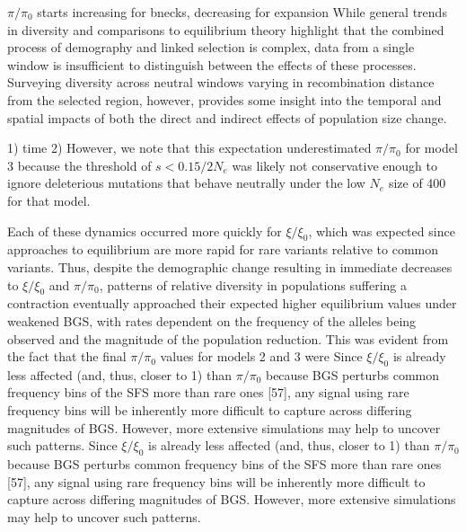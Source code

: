 \documentclass[9pt,twocolumn,twoside]{rilabRxiv}
\begin{document}
$\pi/\pi_0$ starts increasing for bnecks, decreasing for expansion
While general trends in diversity and comparisons to equilibrium theory highlight that the combined process of demography and linked selection is complex, data from a single window is insufficient to distinguish between the effects of these processes.
Surveying diversity across neutral windows varying in recombination distance from the selected region, however, provides some insight into the temporal and spatial impacts of both the direct and indirect effects of population size change. 


1) time 2) However, we note that this expectation underestimated $\pi/\pi_0$ for model 3 because the threshold of $s < 0.15/2N_e$ was likely not conservative enough to ignore deleterious mutations that behave neutrally under the low $N_e$ size of 400 for that model.

Each of these dynamics occurred more quickly for $\xi/\xi_0$, which was expected since approaches to equilibrium are more rapid for rare variants relative to common variants.
Thus, despite the demographic change resulting in immediate decreases to $\xi/\xi_0$ and $\pi/\pi_0$, patterns of relative diversity in populations suffering a contraction eventually approached their expected higher equilibrium values under weakened BGS, with rates dependent on the frequency of the alleles being observed and the  magnitude of the population reduction. 
This was evident from the fact that the final $\pi/\pi_0$ values for models 2 and 3 were
Since $\xi/\xi_0$ is already less affected (and, thus, closer to 1) than $\pi/\pi_0$ because BGS perturbs common frequency bins of the SFS more than rare ones [57], any signal using rare frequency bins will be inherently more difficult to capture across differing magnitudes of BGS. However, more extensive simulations may help to uncover such patterns.
Since $\xi/\xi_0$ is already less affected (and, thus, closer to 1) than $\pi/\pi_0$ because BGS perturbs common frequency
bins of the SFS more than rare ones [57], any signal using rare
frequency bins will be inherently more difficult to capture across
differing magnitudes of BGS. However, more extensive simulations may
help to uncover such patterns.
\end{document}
